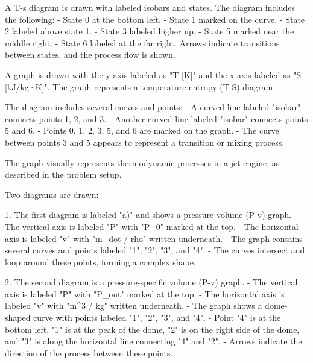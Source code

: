 A T-s diagram is drawn with labeled isobars and states. The diagram includes the following:  
- State 0 at the bottom left.  
- State 1 marked on the curve.  
- State 2 labeled above state 1.  
- State 3 labeled higher up.  
- State 5 marked near the middle right.  
- State 6 labeled at the far right.  
Arrows indicate transitions between states, and the process flow is shown.

A graph is drawn with the y-axis labeled as "T [K]" and the x-axis labeled as "S [kJ/kg·K]". The graph represents a temperature-entropy (T-S) diagram.  

The diagram includes several curves and points:  
- A curved line labeled "isobar" connects points 1, 2, and 3.  
- Another curved line labeled "isobar" connects points 5 and 6.  
- Points 0, 1, 2, 3, 5, and 6 are marked on the graph.  
- The curve between points 3 and 5 appears to represent a transition or mixing process.  

The graph visually represents thermodynamic processes in a jet engine, as described in the problem setup.

Two diagrams are drawn:

1. The first diagram is labeled "a)" and shows a pressure-volume (P-v) graph.  
   - The vertical axis is labeled "P" with "P_0" marked at the top.  
   - The horizontal axis is labeled "v" with "m_dot / rho" written underneath.  
   - The graph contains several curves and points labeled "1", "2", "3", and "4".  
   - The curves intersect and loop around these points, forming a complex shape.  

2. The second diagram is a pressure-specific volume (P-v) graph.  
   - The vertical axis is labeled "P" with "P_out" marked at the top.  
   - The horizontal axis is labeled "v" with "m^3 / kg" written underneath.  
   - The graph shows a dome-shaped curve with points labeled "1", "2", "3", and "4".  
   - Point "4" is at the bottom left, "1" is at the peak of the dome, "2" is on the right side of the dome, and "3" is along the horizontal line connecting "4" and "2".  
   - Arrows indicate the direction of the process between these points.